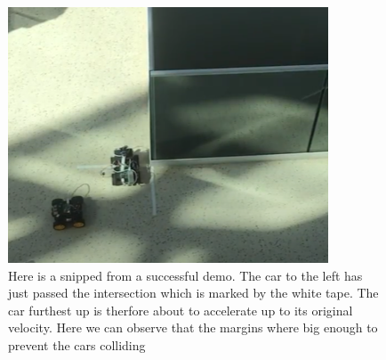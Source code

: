 \begin{figure}[h!]
	\centering
	\includegraphics[width=1\linewidth]{figures/succsess_demo}
	\caption[Successful demo]{Here is a snipped from a successful demo. The car to the left has just passed the intersection which is marked by the white tape. The car furthest up is therfore about to accelerate up to its original velocity. Here we can observe that the margins where big enough to prevent the cars colliding}
	\label{fig:successdemo}
\end{figure}

